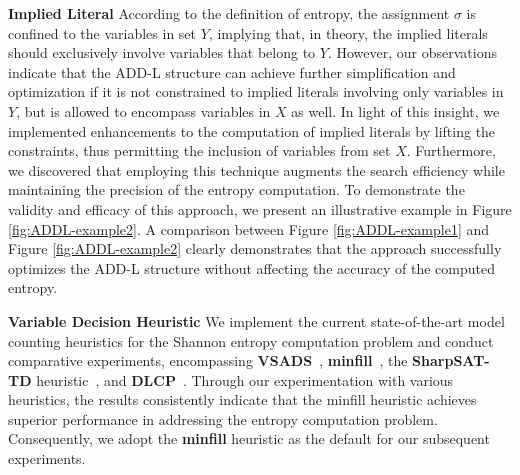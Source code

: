 \textbf{Implied Literal}
According to the definition of entropy, the assignment $\sigma$ is confined to the variables in set $Y$, implying that, in theory, the implied literals should exclusively involve variables that belong to $Y$.
However, our observations indicate that the ADD-L structure can achieve further simplification and optimization if it is not constrained to implied literals involving only variables in $Y$, but is allowed to encompass variables in $X$ as well.
In light of this insight, we implemented enhancements to the computation of implied literals by lifting the constraints, thus permitting the inclusion of variables from set $X$.
Furthermore, we discovered that employing this technique augments the search efficiency while maintaining the precision of the entropy computation.
To demonstrate the validity and efficacy of this approach, we present an illustrative example in Figure \ref{fig:ADDL-example2}.
A comparison between Figure \ref{fig:ADDL-example1} and Figure \ref{fig:ADDL-example2} clearly demonstrates that the approach successfully optimizes the ADD-L structure without affecting the accuracy of the computed entropy.


\textbf{Variable Decision Heuristic} 
We implement the current state-of-the-art model counting heuristics for the Shannon entropy computation problem and conduct comparative experiments, encompassing \textbf{VSADS}~\cite{sang2005heuristics}, \textbf{minfill}~\cite{darwiche2009modeling}, the \textbf{SharpSAT-TD} heuristic~\cite{korhonen2021integrating}, and \textbf{DLCP}~\cite{lai2021power}.
Through our experimentation with various heuristics, the results consistently indicate that the minfill heuristic achieves superior performance in addressing the entropy computation problem.
Consequently, we adopt the \textbf{minfill} heuristic as the default for our subsequent experiments.

